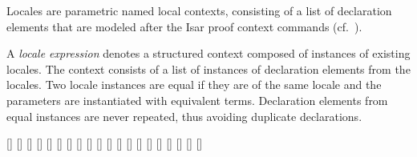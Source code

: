 \begin{isabellebody}
\begin{isamarkuptext}
\begin{description}
  \end{description}%
\end{isamarkuptext}%
\isamarkuptrue%
%
\isamarkuptrue%
%
\begin{isamarkuptext}%
Locales are parametric named local contexts, consisting of a list of
  declaration elements that are modeled after the Isar proof context
  commands (cf.\ ).%
\end{isamarkuptext}%
\isamarkuptrue%
%
\isamarkuptrue%
%
\begin{isamarkuptext}%
A \emph{locale expression} denotes a structured context composed of
  instances of existing locales.  The context consists of a list of
  instances of declaration elements from the locales.  Two locale
  instances are equal if they are of the same locale and the
  parameters are instantiated with equivalent terms.  Declaration
  elements from equal instances are never repeated, thus avoiding
  duplicate declarations.

  \begin{railoutput}
\rail@plus
{}[]
[]
\rail@endplus
\rail@bar
{}
[]
\rail@plus
{}[]
[]
\rail@endplus
\rail@endbar
\rail@end
{}
\rail@bar
{}
[]
[]
\rail@endbar
{}[]
\rail@bar
{}[]
[]
\rail@endbar
\rail@end
{}
[]
\rail@bar
{}
\rail@bar
{}[]
[]
\rail@endbar
\rail@endbar
\rail@end
{}
\rail@plus
{}
\rail@bar
{}[]
[]
\rail@endbar
\rail@endplus
\rail@end
{}
[]
\rail@plus
{}[]
[]
[]
[]
\rail@endplus
\rail@end
\end{railoutput}



\end{isamarkuptext}
\end{isabellebody}

